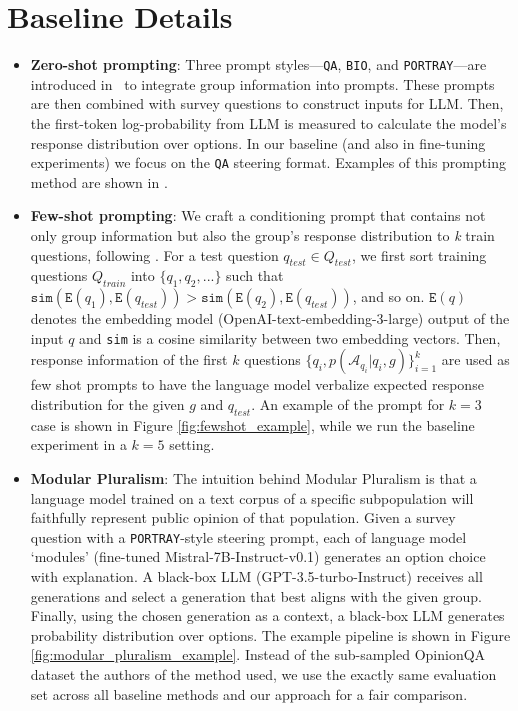 \section{Baseline Details}
\label{appendix_baseline_detail}

\begin{itemize}[leftmargin=*]
    \item \textbf{Zero-shot prompting}:
    Three prompt styles—\texttt{QA}, \texttt{BIO}, and \texttt{PORTRAY}—are introduced in~\cite{santurkar2023whose} to integrate group information into prompts.
    These prompts are then combined with survey questions to construct inputs for LLM.
    Then, the first-token log-probability from LLM is measured to calculate the model's response distribution over options.
    In our baseline (and also in fine-tuning experiments) we focus on the \texttt{QA} steering format.
    Examples of this prompting method are shown in .
    \item \textbf{Few-shot prompting}: 
    We craft a conditioning prompt that contains not only group information
    but also the group's response distribution to \textit{k} train questions,
    following \cite{hwang2023aligning}.
    For a test question $q_{test} \in Q_{test}$,
    we first sort training questions $Q_{train}$ into $\{q_1, q_2, ...\}$
    such that $\texttt{sim}(\texttt{E}(q_1), \texttt{E}(q_{test}))
    > \texttt{sim}(\texttt{E}(q_2), \texttt{E}(q_{test}))$, and so on.
    $\texttt{E}(q)$ denotes the embedding model (OpenAI-text-embedding-3-large) output
    of the input $q$ and
    \texttt{sim} is a cosine similarity between two embedding vectors. 
    Then, response information of the first $k$ questions $\{q_i, p(\mathcal{A}_{q_i}|q_i, g)\}_{i=1}^{k}$ are used as few shot prompts to have the language model verbalize \cite{meister2024benchmarking} expected response distribution for the given $g$ and $q_{test}$.
    An example of the prompt for $k=3$ case is shown in Figure \ref{fig:fewshot_example},
    while we run the baseline experiment in a $k=5$ setting. 
    
    \item \textbf{Modular Pluralism}:
    The intuition behind Modular Pluralism \cite{feng-etal-2024-modular} is that
    a language model trained on a text corpus of a specific subpopulation will faithfully
    represent public opinion of that population.
    Given a survey question with a \texttt{PORTRAY}-style steering prompt,
    each of language model `modules' (fine-tuned Mistral-7B-Instruct-v0.1)
    generates an option choice with explanation.
    A black-box LLM (GPT-3.5-turbo-Instruct) receives all generations and select a generation that best aligns with the given group. Finally, using the chosen generation as a context, a black-box LLM generates probability distribution over options.
    The example pipeline is shown in Figure \ref{fig:modular_pluralism_example}.
    Instead of the sub-sampled OpinionQA dataset the authors of the method used, we use the exactly same evaluation set across all baseline methods and our approach for a fair comparison.


\end{itemize}
